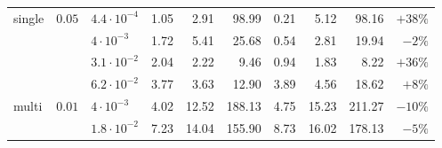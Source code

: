 \documentclass{article}
\numberwithin{equation}{section}
\begin{document}
\begin{table}[htbp]
\begin{tabular}{l l l rrr rrr r}
\midrule
single & $0.05$   & $4.4\cdot10^{-4}$ & 1.05 & 2.91 & 98.99 & 0.21 & 5.12 & 98.16 & $+38\%$ \\
       &          & $4\cdot10^{-3}$   & 1.72 & 5.41 & 25.68 & 0.54 & 2.81 & 19.94 & $-2\%$ \\
       &          & $3.1\cdot10^{-2}$ & 2.04 & 2.22 & 9.46 & 0.94 & 1.83 & 8.22 & $+36\%$ \\
       &          & $6.2\cdot10^{-2}$ & 3.77 & 3.63 & 12.90 & 3.89 & 4.56 & 18.62 & $+8\%$ \\
\midrule
multi  & $0.01$   & $4\cdot10^{-3}$   & 4.02 & 12.52 & 188.13 & 4.75 & 15.23 & 211.27 & $-10\%$ \\
       &          & $1.8\cdot10^{-2}$ & 7.23 & 14.04 & 155.90 & 8.73 & 16.02 & 178.13 & $-5\%$ \\
\bottomrule
\end{tabular}
\end{table}
\end{document}
